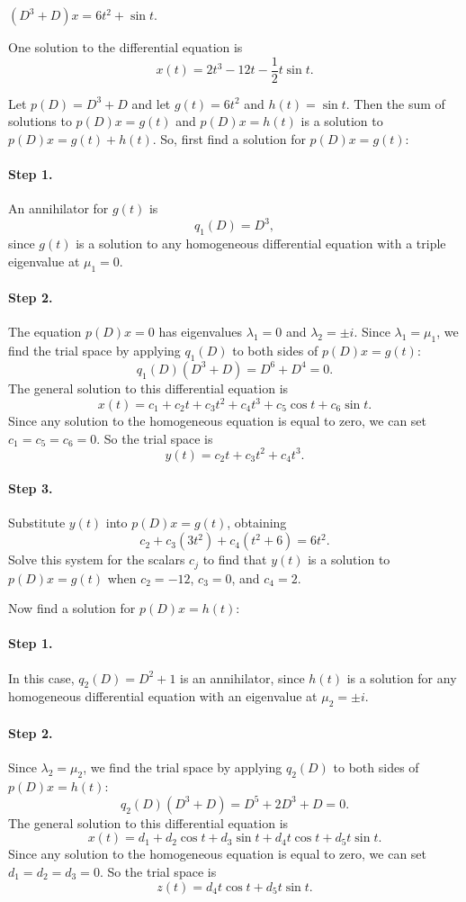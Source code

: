 \documentclass{ximera}
\begin{document}
\begin{exercise}  \label{c12.4.6}
$(D^3+D)x = 6t^2+\sin t$.

\begin{solution}
\ans One solution to the differential equation is
\[
x(t) = 2t^3 - 12t - \frac{1}{2}t\sin t.
\]

\soln Let $p(D) = D^3 + D$ and let $g(t) = 6t^2$ and $h(t) = \sin t$.  Then
the sum of solutions to $p(D)x = g(t)$ and $p(D)x = h(t)$ is a solution to
$p(D)x = g(t) + h(t)$.  So, first find a solution for $p(D)x = g(t)$:
\paragraph{Step 1.} An annihilator for $g(t)$ is
\[
q_1(D) = D^3,
\]
since $g(t)$ is a solution to any homogeneous differential equation
with a triple eigenvalue at $\mu_1 = 0$.

\paragraph{Step 2.} The equation $p(D)x = 0$ has eigenvalues
$\lambda_1 = 0$ and $\lambda_2 = \pm i$.  Since $\lambda_1 = \mu_1$,
we find the trial space by applying $q_1(D)$ to both sides of $p(D)x =
g(t)$:
\[
q_1(D)(D^3 + D) = D^6 + D^4 = 0.
\]
The general solution to this differential equation is
\[
x(t) = c_1 + c_2t + c_3t^2 + c_4t^3 + c_5\cos t + c_6\sin t.
\]
Since any solution to the homogeneous equation is equal to zero, we can
set $c_1 = c_5 = c_6 = 0$.  So the trial space is
\[
y(t) = c_2t + c_3t^2 + c_4t^3.
\]
\paragraph{Step 3.} Substitute $y(t)$ into $p(D)x = g(t)$, obtaining
\[
c_2 + c_3(3t^2) + c_4(t^2 + 6) = 6t^2.
\]
Solve this system for the scalars $c_j$ to find that $y(t)$ is a solution
to $p(D)x = g(t)$ when $c_2 = -12$, $c_3 = 0$, and $c_4 = 2$.

\para Now find a solution for $p(D)x = h(t)$:

\paragraph{Step 1.} In this case, $q_2(D) = D^2 + 1$ is an annihilator,
since $h(t)$ is a solution for any homogeneous differential equation
with an eigenvalue at $\mu_2 = \pm i$.

\paragraph{Step 2.} Since $\lambda_2 = \mu_2$, we find the trial space
by applying $q_2(D)$ to both sides of $p(D)x = h(t)$:
\[
q_2(D)(D^3 + D) = D^5 + 2D^3 + D = 0.
\]
The general solution to this differential equation is
\[
x(t) = d_1 + d_2\cos t + d_3\sin t + d_4t\cos t + d_5t\sin t.
\]
Since any solution to the homogeneous equation is equal to zero, we can
set $d_1 = d_2 = d_3 = 0$.  So the trial space is
\[
z(t) = d_4t\cos t + d_5t\sin t.
\]

\end{solution}
\end{exercise}
\end{document}
